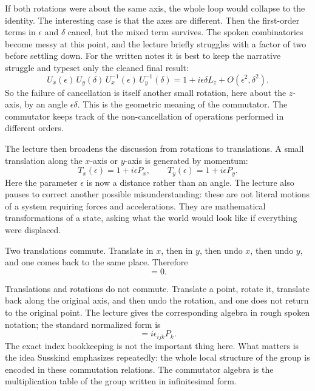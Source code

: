 If both rotations were about the same axis, the whole loop would collapse to the identity. The interesting case is that the axes are different. Then the first-order terms in \(\epsilon\) and \(\delta\) cancel, but the mixed term survives. The spoken combinatorics become messy at this point, and the lecture briefly struggles with a factor of two before settling down. For the written notes it is best to keep the narrative struggle and typeset only the cleaned final result:
\begin{equation}
U_x(\epsilon)\,U_y(\delta)\,U_x^{-1}(\epsilon)\,U_y^{-1}(\delta)
=
1+i\epsilon\delta L_z+O(\epsilon^2,\delta^2).
\end{equation}
So the failure of cancellation is itself another small rotation, here about the \(z\)-axis, by an angle \(\epsilon\delta\). This is the geometric meaning of the commutator. The commutator keeps track of the non-cancellation of operations performed in different orders.

The lecture then broadens the discussion from rotations to translations. A small translation along the \(x\)-axis or \(y\)-axis is generated by momentum:
\begin{equation}
T_x(\epsilon)=1+i\epsilon P_x,
\qquad
T_y(\epsilon)=1+i\epsilon P_y.
\end{equation}
Here the parameter \(\epsilon\) is now a distance rather than an angle. The lecture also pauses to correct another possible misunderstanding: these are not literal motions of a system requiring forces and accelerations. They are mathematical transformations of a state, asking what the world would look like if everything were displaced.

Two translations commute. Translate in \(x\), then in \(y\), then undo \(x\), then undo \(y\), and one comes back to the same place. Therefore
\begin{equation}
[P_i,P_j]=0.
\end{equation}

Translations and rotations do not commute. Translate a point, rotate it, translate back along the original axis, and then undo the rotation, and one does not return to the original point. The lecture gives the corresponding algebra in rough spoken notation; the standard normalized form is
\begin{equation}
[L_i,P_j]=i\epsilon_{ijk}P_k.
\end{equation}
The exact index bookkeeping is not the important thing here. What matters is the idea Susskind emphasizes repeatedly: the whole local structure of the group is encoded in these commutation relations. The commutator algebra is the multiplication table of the group written in infinitesimal form.

